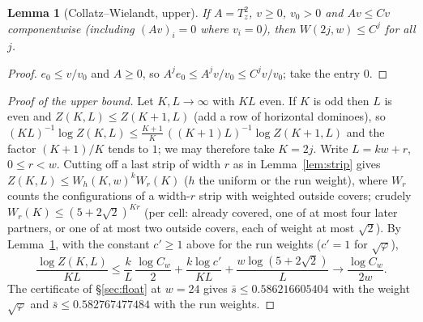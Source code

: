\documentclass[11pt]{amsart}
\newtheorem{lemma}[theorem]{Lemma}
\theoremstyle{definition}
\theoremstyle{remark}
\begin{document}
\begin{lemma}[Collatz--Wielandt, upper]\label{lem:cwup}
If $A = T_z^2$, $v \ge 0$, $v_0 > 0$ and $Av \le Cv$ componentwise (including $(Av)_i = 0$
where $v_i = 0$), then $W(2j, w) \le C^j$ for all $j$.
\end{lemma}
\begin{proof}
$e_0 \le v/v_0$ and $A \ge 0$, so $A^j e_0 \le A^j v / v_0 \le C^j v / v_0$; take the entry $0$.
\end{proof}

\begin{proof}[Proof of the upper bound]
Let $K, L \to \infty$ with $KL$ even. If $K$ is odd then $L$ is even and $Z(K, L) \le Z(K+1, L)$
(add a row of horizontal dominoes), so
$(KL)^{-1}\log Z(K, L) \le \frac{K+1}{K}\,((K+1)L)^{-1}\log Z(K+1, L)$ and the factor
$(K+1)/K$ tends to $1$; we may therefore take $K = 2j$. Write $L = kw + r$, $0 \le r < w$.
Cutting off a last strip of width $r$ as in Lemma~\ref{lem:strip} gives
$Z(K, L) \le W_h(K, w)^k W_r(K)$ ($h$ the uniform or the run weight), where $W_r$ counts the configurations of a width-$r$ strip with
weighted outside covers; crudely $W_r(K) \le (5 + 2\sqrt2)^{Kr}$ (per cell: already covered, one of
at most four later partners, or one of at most two outside covers, each of weight at most $\sqrt2$).
By Lemma~\ref{lem:cwup}, with the constant $c' \ge 1$ above for the run weights ($c' = 1$ for
$\sqrt\varphi$),
\[
  \frac{\log Z(K, L)}{KL} \le \frac{k}{L}\,\frac{\log C_w}{2} + \frac{k \log c'}{KL}
  + \frac{w \log(5 + 2\sqrt2)}{L} \longrightarrow \frac{\log C_w}{2w}.
\]
The certificate of \S\ref{sec:float} at $w = 24$ gives $\bar s \le 0.586216605404$ with the weight
$\sqrt\varphi$ and $\bar s \le 0.582767477484$ with the run weights.
\end{proof}
\end{document}
